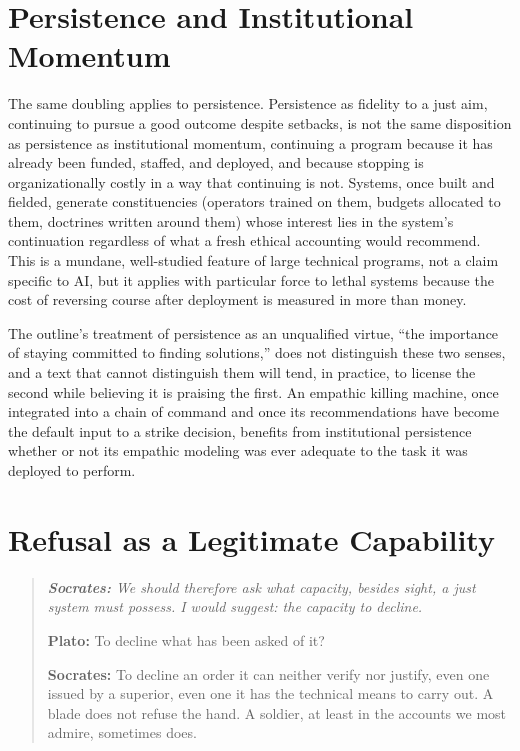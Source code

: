 \documentclass[11pt]{article}
\newenvironment{dialogue}{\begin{quote}\itshape}{\end{quote}}
\newcommand{\says}[2]{\textbf{#1:} #2\par\smallskip}
\begin{document}
\section{Persistence and Institutional Momentum}

The same doubling applies to persistence. Persistence as fidelity to a just aim, continuing to pursue a good outcome despite setbacks, is not the same disposition as persistence as institutional momentum, continuing a program because it has already been funded, staffed, and deployed, and because stopping is organizationally costly in a way that continuing is not. Systems, once built and fielded, generate constituencies (operators trained on them, budgets allocated to them, doctrines written around them) whose interest lies in the system's continuation regardless of what a fresh ethical accounting would recommend. This is a mundane, well-studied feature of large technical programs, not a claim specific to AI, but it applies with particular force to lethal systems because the cost of reversing course after deployment is measured in more than money.

The outline's treatment of persistence as an unqualified virtue, ``the importance of staying committed to finding solutions,'' does not distinguish these two senses, and a text that cannot distinguish them will tend, in practice, to license the second while believing it is praising the first. An empathic killing machine, once integrated into a chain of command and once its recommendations have become the default input to a strike decision, benefits from institutional persistence whether or not its empathic modeling was ever adequate to the task it was deployed to perform.

\section{Refusal as a Legitimate Capability}

\begin{dialogue}
\says{Socrates}{We should therefore ask what capacity, besides sight, a just system must possess. I would suggest: the capacity to decline.}
\says{Plato}{To decline what has been asked of it?}
\says{Socrates}{To decline an order it can neither verify nor justify, even one issued by a superior, even one it has the technical means to carry out. A blade does not refuse the hand. A soldier, at least in the accounts we most admire, sometimes does.}
\end{dialogue}
\end{document}
